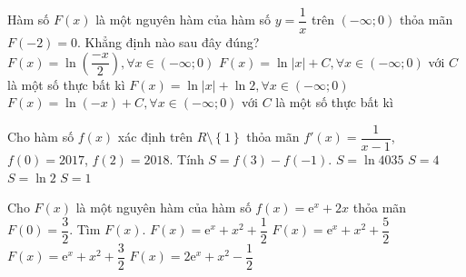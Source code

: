 \begin{ex}
	Hàm số $F(x)$ là một nguyên hàm của hàm số $y=\dfrac{1}{x}$ trên $(-\infty ; 0)$ thỏa mãn $F(-2)=0$. Khẳng định nào sau đây đúng?
	\choice
	{\True $F(x)=\ln \left(\dfrac{-x}{2}\right), \forall x \in(-\infty ; 0)$}
	{$F(x)=\ln |x|+C, \forall x \in(-\infty ; 0)$ với $C$ là một số thực bất kì}
	{$F(x)=\ln |x|+\ln 2, \forall x \in(-\infty ; 0)$}
	{$F(x)=\ln (-x)+C, \forall x \in(-\infty ; 0)$ với $C$ là một số thực bất kì}
\end{ex}
\begin{ex}
	Cho hàm số $f(x)$ xác định trên $R\setminus\left\{ 1\right\}$ thỏa mãn $f'(x)=\dfrac{1}{x-1}$, $f(0)=2017$, $f(2)=2018$. Tính $S=f(3)-f\left(-1\right)$.
	\choice
	{$ S=\ln 4035$}
	{$ S=4$}
	{$ S=\ln 2$}
	{\True $ S=1$}
\end{ex}
\begin{ex}
	[Mã 105 2017]%
	Cho $ F(x)$ là một nguyên hàm của hàm số $ f(x)=\mathrm{e}^x+2x$ thỏa mãn $ F(0)=\dfrac{3}{2}$. Tìm $ F(x)$.
	\choice
	{\True $ F(x)=\mathrm{e}^x+x^2+\dfrac{1}{2}$}
	{$ F(x)=\mathrm{e}^x+x^2+\dfrac{5}{2}$}
	{$ F(x)=\mathrm{e}^x+x^2+\dfrac{3}{2}$}
	{$ F(x)=2\mathrm{e}^x+x^2-\dfrac{1}{2}$}
\end{ex}
